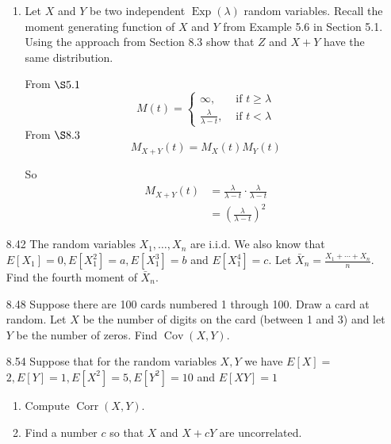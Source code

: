 \documentclass[10pt]{article}
\begin{document}
\begin{itemize}
\begin{enumerate}
       \item Let $X$ and $Y$ be two independent $\operatorname{Exp}(\lambda)$ random variables. Recall the moment generating function of $X$ and $Y$ from Example 5.6 in Section 5.1. Using the approach from Section 8.3 show that $Z$ and $X+Y$ have the same distribution.

          From $\S 5.1$
          \[
         M(t)= \begin{cases}\infty, & \text { if } t \geq \lambda \\ \frac{\lambda}{\lambda-t}, & \text { if } t<\lambda\end{cases}
         \]
          From $\S 8.3$
          \[ M_{X+Y}(t)=M_X(t) M_Y(t) \]

          So
          \begin{align*}
             M_{X+Y}(t) &= \frac{\lambda}{\lambda-t} \cdot \frac{\lambda}{\lambda-t} \\
             &= \left( \frac{\lambda}{\lambda-t} \right)^2
          \end{align*}


     \end{enumerate}

\newpage
   \item[8.42] The random variables $X_{1}, \ldots, X_{n}$ are i.i.d. We also know that $E\left[X_{1}\right]=0, E\left[X_{1}^{2}\right]=a, E\left[X_{1}^{3}\right]=b$ and $E\left[X_{1}^{4}\right]=c$. Let $\bar{X}_{n}=\frac{X_{1}+\cdots+X_{n}}{n}$. Find the fourth moment of $\bar{X}_{n}$.

\newpage
   \item[8.48] Suppose there are 100 cards numbered 1 through 100. Draw a card at random. Let $X$ be the number of digits on the card (between 1 and 3) and let $Y$ be the number of zeros. Find $\operatorname{Cov}(X, Y)$.

\newpage
   \item[8.54] Suppose that for the random variables $X, Y$ we have $E[X]=$ $2, E[Y]=1, E\left[X^{2}\right]=5, E\left[Y^{2}\right]=10$ and $E[X Y]=1$

     \begin{enumerate}
       \item Compute $\operatorname{Corr}(X, Y)$.

       \item Find a number $c$ so that $X$ and $X+c Y$ are uncorrelated.
     \end{enumerate}
\end{itemize}
\end{document}

